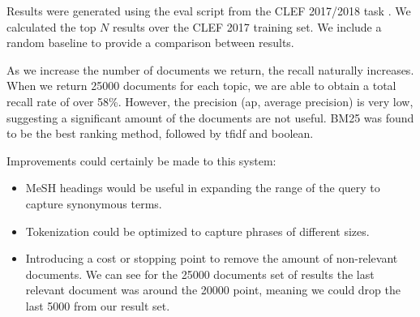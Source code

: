 Results were generated using the eval script from the CLEF 2017/2018 task \cite{Kanoulas12017}. We calculated the top $N$ results over the CLEF 2017 training set. We include a random baseline  to provide a comparison between results.


\begin{table}[H]
\caption{Results for IR Pubmed system. Comparison for both 5000 and 25000 thresholds}
\end{table}


As we increase the number of documents we return, the recall naturally increases. When we return 25000 documents for each topic, we are able to obtain a total recall rate of over 58\%. However, the precision (ap, average precision) is very low, suggesting a significant amount of the documents are not useful. BM25 was found to be the best ranking method, followed by tfidf and boolean.

Improvements could certainly be made to this system:

\begin{itemize}
  \item MeSH headings would be useful in expanding the range of the query to capture synonymous terms. 
  \item Tokenization could be optimized to capture phrases of different sizes.
  \item Introducing a cost or stopping point to remove the amount of non-relevant documents. We can see for the 25000 documents set of results the last relevant document was around the 20000 point, meaning we could drop the last 5000 from our result set.
\end{itemize}


